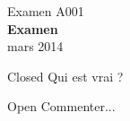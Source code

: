 \documentclass[a4paper,10pt]{article}
\begin{document}

\begin{center}
{\Large Examen A001} \\  \textbf{\Large Examen} \\ mars 2014
\end{center}

\begin{question}{Closed}
Qui est vrai ?
\begin{reponses}[o]
\end{reponses}
\end{question}

\begin{question}{Open}
Commenter...
\end{question}

\cleardoublepage


\end{document}
